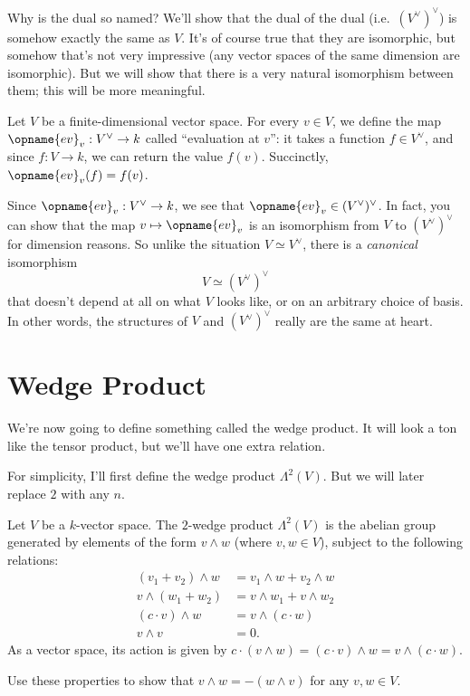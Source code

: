 \begin{itemize}
	\ii Why is the dual so named?
	We'll show that the dual of the dual (i.e.\ $(V^\vee)^\vee$)
	is somehow exactly the same as $V$.
	It's of course true that they are isomorphic, but somehow that's
	not very impressive (any vector spaces of the same dimension are isomorphic).
	But we will show that there is a very natural isomorphism between them;
	this will be more meaningful.

	Let $V$ be a finite-dimensional vector space.
	For every $v \in V$, we define the map $\opname{ev}_v : V^\vee \to k$
	called ``evaluation at $v$'': it takes a function $f \in V^\vee$,
	and since $f : V \to k$, we can return the value $f(v)$.
	Succinctly, $\opname{ev}_v(f) = f(v)$.

	Since $\opname{ev}_v : V^\vee \to k$, we see that
	$\opname{ev}_v \in (V^\vee)^\vee$.
	In fact, you can show that the map $v \mapsto \opname{ev}_v$
	is an isomorphism from $V$ to $(V^\vee)^\vee$ for dimension reasons.
	So unlike the situation $V \simeq V^\vee$, there
	is a \emph{canonical} isomorphism \[ V \simeq (V^\vee)^\vee \]
	that doesn't depend at all on what $V$ looks like,
	or on an arbitrary choice of basis.
	In other words, the structures of $V$ and $(V^\vee)^\vee$
	really are the same at heart.
\end{itemize}



\section{Wedge Product}
We're now going to define something called the wedge product.
It will look a ton like the tensor product, but we'll have one extra relation.

For simplicity, I'll first define the wedge product $\Lambda^2(V)$.
But we will later replace $2$ with any $n$.

\begin{definition}
	Let $V$ be a $k$-vector space.
	The $2$-wedge product $\Lambda^2(V)$ is the abelian group
	generated by elements of the form $v \wedge w$ (where $v,w \in V$),
	subject to the following relations:
	\begin{align*}
		(v_1 + v_2) \wedge w &= v_1 \wedge w + v_2 \wedge w \\
		v \wedge (w_1 + w_2) &= v \wedge w_1 + v \wedge w_2 \\
		(c \cdot v) \wedge w &= v \wedge (c \cdot w) \\
		v \wedge v &= 0.
	\end{align*}
	As a vector space, its action is given by
	$c \cdot (v \wedge w) = (c \cdot v) \wedge w = v \wedge (c \cdot w)$.
\end{definition}
\begin{exercise}
	Use these properties to show that $v \wedge w = - (w \wedge v)$
	for any $v,w \in V$.
\end{exercise}

